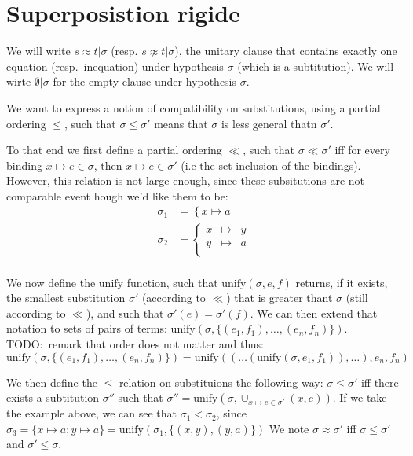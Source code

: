 
\section{Superposistion rigide}

\EnableBpAbbreviations{}

We will write $s \approx t | \sigma$ (resp. $s \not\approx t | \sigma$),
the unitary clause that contains exactly one equation (resp.~inequation)
under hypothesis $\sigma$ (which is a subtitution).
We will wirte $\emptyset | \sigma$ for the empty clause under hypothesis $\sigma$.


We want to express a notion of compatibility on substitutions, using a
partial ordering $\leq$, such that $\sigma \leq \sigma'$ means that $\sigma$ is
less general thatn $\sigma'$.


To that end we first define a partial ordering $\ll$, such that $\sigma \ll \sigma'$
iff for every binding $x \mapsto e \in \sigma$, then $x \mapsto e \in \sigma'$
(i.e the set inclusion of the bindings). However, this relation is not large enough,
since these subsitutions are not comparable event hough we'd like them to be:
\begin{eqnarray*}
  \sigma_1 &= \left\{ x \mapsto a \right. \\
  \sigma_2 &= \left\{
    \begin{matrix}
      x & \mapsto & y \\
      y & \mapsto & a \\
    \end{matrix}\right. \\
\end{eqnarray*}


We now define the $\text{unify}$ function, such that $\text{unify}(\sigma, e, f)$
returns, if it exists, the smallest substitution $\sigma'$ (according to $\ll$)
that is greater thant $\sigma$ (still according to $\ll$), and such that
$\sigma'(e) = \sigma'(f)$. We can then extend that notation to sets of pairs
of terms: $\text{unify}(\sigma, \{ (e_1, f_1), \ldots, (e_n, f_n)\})$.
TODO:~remark that order does not matter and thus:
$\text{unify}(\sigma, \{ (e_1, f_1), \ldots, (e_n, f_n)\})
  = \text{unify}((\ldots (\text{unify}(\sigma, e_1, f_1)), \ldots), e_n, f_n)$


We then define the $\leq$ relation on substituions the following way:
$\sigma \leq \sigma'$ iff there exists a subtitution $\sigma''$ such that
$\sigma'' = \text{unify}(\sigma, \cup_{x \mapsto e \in \sigma'} (x, e))$.
If we take the example above, we can see that $\sigma_1 < \sigma_2$, since
$\sigma_3 = \{ x \mapsto a; y \mapsto a\} = \text{unify}(\sigma_1, \{ (x, y), (y, a)\})$
We note $\sigma \approx \sigma'$ iff $\sigma \leq \sigma'$ and $\sigma' \leq \sigma$.

